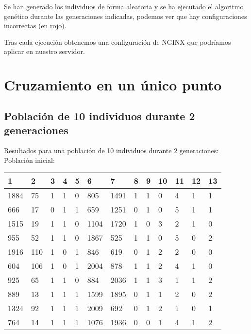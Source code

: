 \bigskip
Se han generado los individuos de forma aleatoria y se ha ejecutado el algoritmo genético durante las generaciones indicadas, podemos ver que hay configuraciones incorrectas (en rojo).

\bigskip
Tras cada ejecución obtenemos una configuración de NGINX que podríamos aplicar en nuestro servidor.

\section{Cruzamiento en un único punto}

\subsection{Población de 10 individuos durante 2 generaciones}
Resultados para una población de 10 individuos durante 2 generaciones:
Población inicial:
\begin{table}[H]
\begin{tabular}{|l|l|l|l|l|l|l|l|l|l|l|l|l|}
\hline
\textbf{1} & \textbf{2} & \textbf{3} & \textbf{4} & \textbf{5} & \textbf{6} & \textbf{7} & \textbf{8} & \textbf{9} & \textbf{10} & \textbf{11} & \textbf{12} & \textbf{13} \\ \hline
1884  &  75  &  1  &  1  &  0  &  805  &  1491  &  1  &  1  &  0  &  {\color[HTML]{FE0000}4}  &  1  &  1 \\ \hline
666  &  17  &  0  &  1  &  1  &  659  &  1251  &  0  &  1  &  0  &  {\color[HTML]{FE0000}5}  &  1  &  1 \\ \hline
1515  &  19  &  1  &  1  &  0  &  1104  &  1720  &  1  &  0  &  3  &  2  &  1  &  0 \\ \hline
955  &  52  &  1  &  1  &  0  &  1867  &  525  &  1  &  1  &  0  &  {\color[HTML]{FE0000}5}  &  0  &  2 \\ \hline
1916  &  110  &  1  &  0  &  1  &  846  &  619  &  0  &  1  &  2  &  2  &  0  &  0 \\ \hline
604  &  106  &  1  &  0  &  1  &  2004  &  878  &  1  &  1  &  2  &  {\color[HTML]{FE0000}4}  &  1  &  0 \\ \hline
925  &  65  &  1  &  1  &  0  &  884  &  2036  &  1  &  1  &  3  &  1  &  1  &  2 \\ \hline
889  &  13  &  1  &  1  &  1  &  1599  &  1895  &  0  &  1  &  1  &  2  &  0  &  2 \\ \hline
1324  &  92  &  1  &  1  &  1  &  2009  &  692  &  0  &  1  &  2  &  1  &  0  &  1 \\ \hline
764  &  14  &  1  &  1  &  1  &  1076  &  1936  &  0  &  0  &  1  &  {\color[HTML]{FE0000}4}  &  1  &  2 \\ \hline
\end{tabular}
\end{table}
